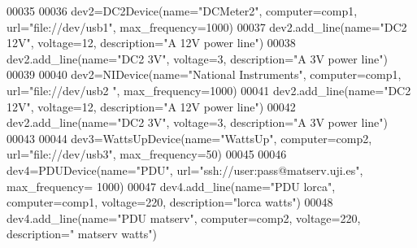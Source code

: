 \begin{DoxyCode}
00035 
00036 dev2=DC2Device(name=\textcolor{stringliteral}{"DCMeter2"}, computer=comp1, url=\textcolor{stringliteral}{"file://dev/usb1"}, 
      max\_frequency=1000)
00037 dev2.add\_line(name=\textcolor{stringliteral}{"DC2 12V"}, voltage=12, description=\textcolor{stringliteral}{"A 12V power line"})
00038 dev2.add\_line(name=\textcolor{stringliteral}{"DC2 3V"}, voltage=3, description=\textcolor{stringliteral}{"A 3V power line"})
00039 
00040 dev2=NIDevice(name=\textcolor{stringliteral}{"National Instruments"}, computer=comp1, url=\textcolor{stringliteral}{"file://dev/usb2
      "}, max\_frequency=1000)
00041 dev2.add\_line(name=\textcolor{stringliteral}{"DC2 12V"}, voltage=12, description=\textcolor{stringliteral}{"A 12V power line"})
00042 dev2.add\_line(name=\textcolor{stringliteral}{"DC2 3V"}, voltage=3, description=\textcolor{stringliteral}{"A 3V power line"})
00043 
00044 dev3=WattsUpDevice(name=\textcolor{stringliteral}{"WattsUp"}, computer=comp2, url=\textcolor{stringliteral}{"file://dev/usb3"}, 
      max\_frequency=50)
00045 
00046 dev4=PDUDevice(name=\textcolor{stringliteral}{"PDU"}, url=\textcolor{stringliteral}{"ssh://user:pass@matserv.uji.es"}, max\_frequency=
      1000)
00047 dev4.add\_line(name=\textcolor{stringliteral}{"PDU lorca"}, computer=comp1, voltage=220, description=\textcolor{stringliteral}{"lorca
       watts"})
00048 dev4.add\_line(name=\textcolor{stringliteral}{"PDU matserv"}, computer=comp2, voltage=220, description=\textcolor{stringliteral}{"
      matserv watts"})
\end{DoxyCode}
